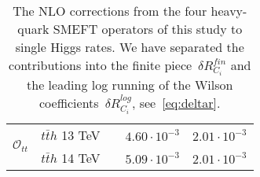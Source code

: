 \begin{table}[t!]
{\begin{tabular}{c||cccc}
			  \midrule	    	 
			 \multirow{2}{*}{{ \normalsize$\mathcal{O}_{tt}$}  }
			 &  $t\bar t h$ {\color{Mahogany}  13 TeV }& \mr{$m_t+\frac{m_h}{ 2}$}&  {$4.60\cdot 10^{-3}$} &$2.01\cdot 10^{-3}$\\	    
			 &   $t\bar t h$  {\color{Mahogany}  14 TeV }& & $5.09\cdot 10^{-3}$& $2.01\cdot 10^{-3}$\\                                           	
			\bottomrule
		\end{tabular}
	}
	\caption{The NLO corrections from the four heavy-quark SMEFT operators of this study to single Higgs rates. We have separated the contributions into the finite piece~$ \delta R_{C_i}^{fin}$ and the leading log running of the Wilson coefficients~$ \delta R_{C_i}^{log}$, see~\eqref{eq:deltar}. }
\label{table:res4top}
\end{table}


